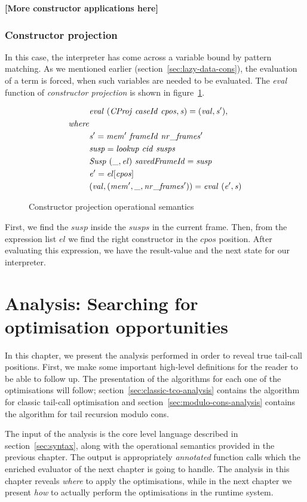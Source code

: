 \documentclass[diploma]{softlab-thesis}
\begin{document}
\textbf{[More constructor applications here]}

\subsection{Constructor projection}

In this case, the interpreter has come across a variable bound by 
pattern matching. As we mentioned earlier (section~\ref{sec:lazy-data-cons}), the evaluation
of a term is forced, when such variables are needed to be evaluated.
The \textit{eval} function of \textit{constructor projection} is shown in 
figure~\ref{fig:consproj}.
\begin{figure}[htp]
  \begin{align*}
    & \mathit{eval \hfill\ (CProj \hfill\ caseId \hfill\ cpos, s) = (val, s'),} \\
    \mathit{where } \\
    & \mathit{s' = mem' \hfill\ frameId \hfill\ nr\_frames'} \\
    & \mathit{susp = lookup \hfill\ cid \hfill\ susps} \\
    & \mathit{Susp \hfill\ (\_, el) \hfill\ savedFrameId = susp} \\
    & \mathit{e' = el[cpos]} \\
    & \mathit{(val, (mem', \_, nr\_frames')) = eval \hfill\ (e', s)}
  \end{align*}
\caption{Constructor projection operational semantics\label{fig:consproj}}
\end{figure}
First, we find the $\mathit{susp}$ inside the $\mathit{susps}$ in the current frame. Then, 
from the expression list $\mathit{el}$ we find the right constructor in the $\mathit{cpos}$ 
position. After evaluating this expression, we have the result-value and the next state 
for our interpreter.

\chapter{Analysis: Searching for optimisation opportunities}
\label{ch:analysis}

In this chapter, we present the analysis performed in order to reveal true tail-call positions.
First, we make some important high-level definitions for the reader to be able to follow up. 
The presentation of the algorithms for each one of the optimisations will follow; section~\ref{sec:classic-tco-analysis} contains 
the algorithm for classic tail-call optimisation and section~\ref{sec:modulo-cons-analysis} contains the algorithm for tail recursion modulo cons.
\newline
\par The input of the analysis is the core level language described in section~\ref{sec:syntax}, 
along with the operational semantics provided in the previous chapter. The output is appropriately 
\textit{annotated} function calls which the enriched evaluator of the next chapter is going to handle.
The analysis in this chapter reveals \textit{where} to apply the optimisations, while 
in the next chapter we present \textit{how} to actually perform the optimisations in the runtime system.
\end{document}
